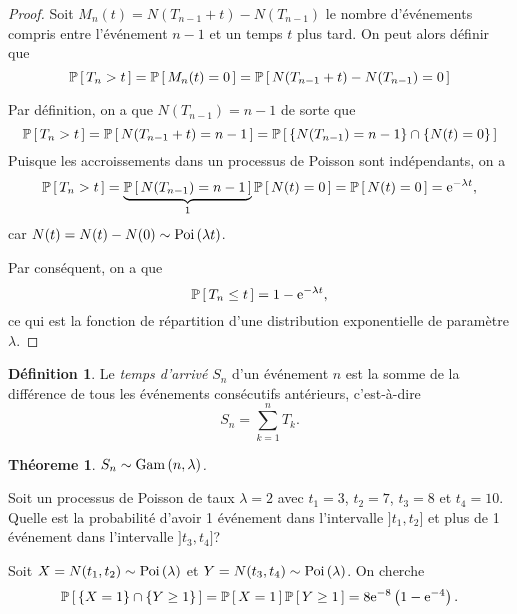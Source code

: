 \documentclass[11pt]{article}
\makeatletter
\renewcommand\P[1]{%
	\ensuremath{%
		\mathbb{P}\left[\,#1\,\right]%
	}%
}%
\newcommand\e{%
	\ensuremath{%
		\mathrm{e}%
	}%
}%
\newcommand\Poi[1]{%
	\ensuremath{%
		\mathrm{Poi}\left(#1\right)%
	}%
}%
\newcommand\Gam[2]{%
	\ensuremath{%
		\mathrm{Gam}\left(#1,#2\right)%
	}%
}%
\newtheorem{theoreme}{Théoreme}[section]
\theoremstyle{remark}
\theoremstyle{definition}
\newtheorem*{@definition}{Définition}
\newenvironment{definition}{%
	\begin{@definition}%
}{%
	\end{@definition}%
	\setcounter{property}{0}%
}
\makeatother
\begin{document}
\begin{proof}
	Soit $M_n(t)=N(T_{n-1}+t)-N(T_{n-1})$ le nombre d'événements compris entre
	l'événement $n-1$ et un temps $t$ plus tard. On peut alors définir que
	\begin{equation*}
		\P{T_n>t}
		=\P{M_n(t)=0}
		=\P{N(T_{n-1}+t)-N(T_{n-1})=0}
	\end{equation*}

	Par définition, on a que $N(T_{n-1})=n-1$ de sorte que
	\begin{equation*}
		\P{T_n>t}
		=\P{N(T_{n-1}+t)=n-1}
		=\P{\left\{N(T_{n-1})=n-1\right\}\cap\left\{N(t)=0\right\}}
	\end{equation*}
	Puisque les accroissements dans un processus de Poisson sont indépendants,
	on a
	\begin{equation*}
		\P{T_n>t}
		=\underbrace{\P{N(T_{n-1})=n-1}}_{1}\P{N(t)=0}
		=\P{N(t)=0}
		=\e^{-\lambda t},
	\end{equation*}
	car $N(t)=N(t)-N(0)\sim\Poi{\lambda t}$.
	
	Par conséquent, on a que
	\begin{equation*}
		\P{T_n\leq t}=1-\e^{-\lambda t},
	\end{equation*}
	ce qui est la fonction de répartition d'une distribution exponentielle de
	paramètre $\lambda$.
\end{proof}

\begin{definition}
	Le \textit{temps d'arrivé} $S_n$ d'un événement $n$ est la somme de la
	différence de tous les événements consécutifs antérieurs, c'est-à-dire
	\begin{equation*}
		S_n=\sum_{k=1}^nT_k.
	\end{equation*}
\end{definition}

\begin{theoreme}
	$S_n\sim\Gam{n}{\lambda}$.
\end{theoreme}

\begin{exemple}
	Soit un processus de Poisson de taux $\lambda=2$ avec $t_1=3$, $t_2=7$,
	$t_3=8$ et $t_4=10$. Quelle est la probabilité d'avoir 1 événement dans
	l'intervalle $]t_1,t_2]$ et plus de 1 événement dans l'intervalle
	$]t_3,t_4]$?
	
	Soit $X=N(t_1,t_2)\sim\Poi{\lambda}$ et $Y=N(t_3,t_4)\sim\Poi{\lambda}$. On
	cherche
	\begin{equation*}
		\P{\left\{X=1\right\}\cap\left\{Y\geq 1\right\}}
		=\P{X=1}\P{Y\geq 1}
		=8\e^{-8}\left(1-\e^{-4}\right).
	\end{equation*}
\end{exemple}
\end{document}
